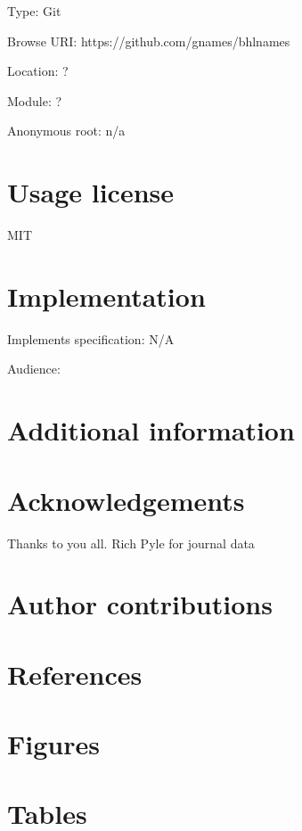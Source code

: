 \documentclass[
]{article}
\begin{document}
Type: Git

Browse URI: https://github.com/gnames/bhlnames

Location: ?

Module: ?

Anonymous root: n/a

\hypertarget{usage-license}{%
\section{Usage license}\label{usage-license}}

MIT

\hypertarget{implementation}{%
\section{Implementation}\label{implementation}}

Implements specification: N/A

Audience:

\hypertarget{additional-information}{%
\section{Additional information}\label{additional-information}}

\hypertarget{acknowledgements}{%
\section{Acknowledgements}\label{acknowledgements}}

Thanks to you all. Rich Pyle for journal data

\hypertarget{author-contributions}{%
\section{Author contributions}\label{author-contributions}}

\hypertarget{references}{%
\section{References}\label{references}}

\hypertarget{figures}{%
\section{Figures}\label{figures}}

\hypertarget{tables}{%
\section{Tables}\label{tables}}
\end{document}
